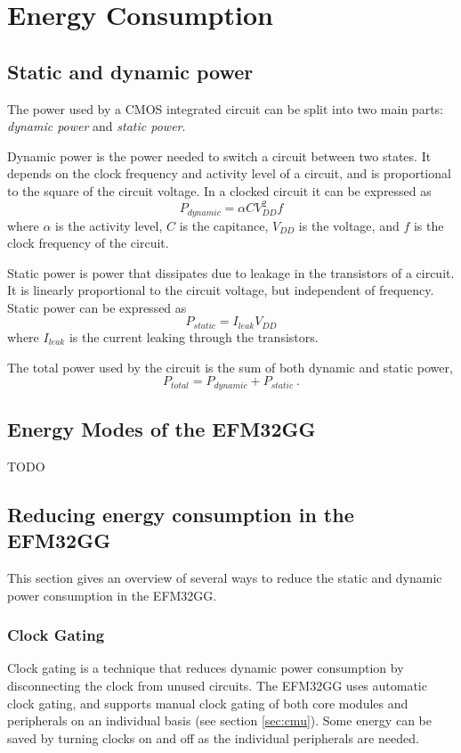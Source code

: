 \section{Energy Consumption}

\subsection{Static and dynamic power}
The power used by a CMOS integrated circuit can be split into two main parts: \emph{dynamic power} and \emph{static power}. 

Dynamic power is the power needed to switch a circuit between two states. It depends on the clock frequency and activity level of a circuit, and is proportional to the square of the circuit voltage. In a clocked circuit it can be expressed as
$$P_{dynamic} = \alpha CV_{DD}^{2}f$$
where $\alpha$ is the activity level, $C$ is the capitance, $V_{DD}$ is the voltage, and $f$ is the clock frequency of the circuit.

Static power is power that dissipates due to leakage in the transistors of a circuit. It is linearly proportional to the circuit voltage, but independent of frequency. Static power can be expressed as
$$P_{static} = I_{leak}V_{DD}$$
where $I_{leak}$ is the current leaking through the transistors.

The total power used by the circuit is the sum of both dynamic and static power,
$$P_{total} = P_{dynamic} + P_{static}\ .$$
\cite{cmos-vlsi-design}


\subsection{Energy Modes of the EFM32GG}
TODO %


\subsection{Reducing energy consumption in the EFM32GG}
This section gives an overview of several ways to reduce the static and dynamic power consumption in the EFM32GG.

\subsubsection{Clock Gating}
Clock gating is a technique that reduces dynamic power consumption by disconnecting the clock from unused circuits. The EFM32GG uses automatic clock gating, and supports manual clock gating of both core modules and peripherals on an individual basis (see section \ref{sec:cmu}). Some energy can be saved by turning clocks on and off as the individual peripherals are needed.\cite{efm32-energy-optimization} 



